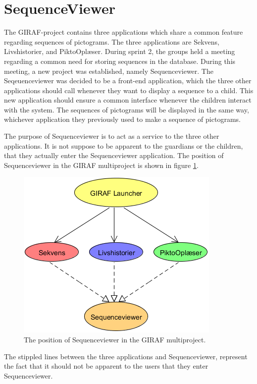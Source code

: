 \section{SequenceViewer}\label{sec:sequenceviewer}
The GIRAF-project contains three applications which share a common feature regarding sequences of pictograms. The three applications are Sekvens, Livshistorier, and PiktoOplæser. During sprint 2, the groups held a meeting regarding a common need for storing sequences in the database. During this meeting, a new project was established, namely Sequenceviewer. The Seqeuenceviewer was decided to be a front-end application, which the three other applications should call whenever they want to display a sequence to a child. This new application should ensure a common interface whenever the children interact with the system. The sequences of pictograms will be displayed in the same way, whichever application they previously used to make a sequence of pictograms.

The purpose of Sequenceviewer is to act as a service to the three other applications. It is not suppose to be apparent to the guardians or the children, that they actually enter the Sequenceviewer application. The position of Sequenceviewer in the GIRAF multiproject is shown in figure \ref{fig:sequenceviewer}.

\begin{figure}[H]
	\centering
	\includegraphics[scale=0.8]{Pics/sequenceviewer}
	\caption{The position of Sequenceviewer in the GIRAF multiproject.}
	\label{fig:sequenceviewer}
\end{figure}

The stippled lines between the three applications and Sequenceviewer, represent the fact that it should not be apparent to the users that they enter Sequenceviewer.

